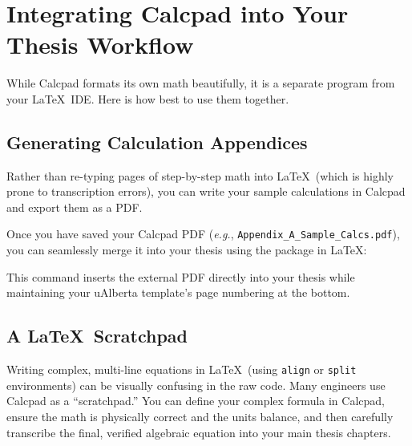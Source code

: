 	\section{Integrating Calcpad into Your Thesis Workflow}
		While Calcpad formats its own math beautifully, it is a separate program from your \LaTeX\ IDE. Here is how best to use them together.

		\subsection{Generating Calculation Appendices}
			Rather than re-typing pages of step-by-step math into \LaTeX\ (which is highly prone to transcription errors), you can write your sample calculations in Calcpad and export them as a PDF. 

			Once you have saved your Calcpad PDF (\textit{e.g.}, \texttt{Appendix\_A\_Sample\_Calcs.pdf}), you can seamlessly merge it into your thesis using the  package in \LaTeX:

			\begin{center}
			\end{center}

			This command inserts the external PDF directly into your thesis while maintaining your uAlberta template's page numbering at the bottom.
		
		\subsection{A \LaTeX\ Scratchpad}
			Writing complex, multi-line equations in \LaTeX\ (using \texttt{align} or \texttt{split} environments) can be visually confusing in the raw code. 
			Many engineers use Calcpad as a \enquote{scratchpad.} 
			You can define your complex formula in Calcpad, ensure the math is physically correct and the units balance, and then carefully transcribe the final, verified algebraic equation into your main thesis chapters.

